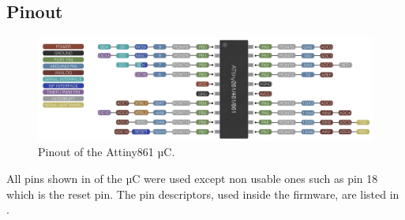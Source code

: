 \subsection{Pinout}

\begin{figure}[!ht]
    \centering
    \includegraphics[width=13cm]{./Figures/attiny861_pinout.jpg}
    \caption{Pinout of the Attiny861 µC.}
    \label{fig:attiny861_pinout}     
\end{figure}


\noindent All pins shown in  of the µC were used except non usable ones such as pin 18 which is the reset pin. The pin descriptors, used inside the firmware, are listed in .

